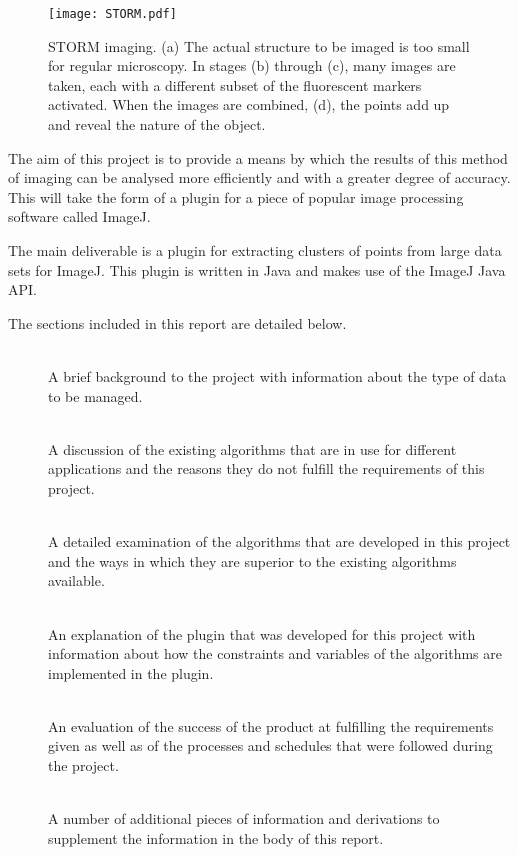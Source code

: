 \begin{figure}[tbh]
	\centering
	\texttt{[image: STORM.pdf]}

	\caption[Creation of a STORM image.]{STORM imaging. (a) The actual
		structure to be imaged is too small for regular microscopy. In stages
		(b) through (c), many images are taken, each with a different subset of
		the fluorescent markers activated. When the images are combined, (d),
		the points add up and reveal the nature of the object.}\label{fig:STORM}
\end{figure}

The aim of this project is to provide a means by which the results of this
method of imaging can be analysed more efficiently and with a greater degree of
accuracy. This will take the form of a plugin for a piece of popular image
processing software called ImageJ.

The main deliverable is a plugin for extracting clusters of points from large
data sets for ImageJ. This plugin is written in Java and makes use of the
ImageJ Java API\cite{imagejapi}.

The sections included in this report are detailed below.

\begin{description}
	\item[] \hfill \\
		A brief background to the project with information about the type of
		data to be managed.

	\item[] \hfill \\
		A discussion of the existing algorithms that are in use for different
		applications and the reasons they do not fulfill the requirements of
		this project.

	\item[] \hfill \\
		A detailed examination of the algorithms that are developed in this
		project and the ways in which they are superior to the existing
		algorithms available.

	\item[] \hfill \\
		An explanation of the plugin that was developed for this project with
		information about how the constraints and variables of the algorithms
		are implemented in the plugin.

	\item[] \hfill \\
		An evaluation of the success of the product at fulfilling the
		requirements given as well as of the processes and schedules that were
		followed during the project.

	\item[] \hfill \\
		A number of additional pieces of information and derivations to
		supplement the information in the body of this report.
\end{description}
